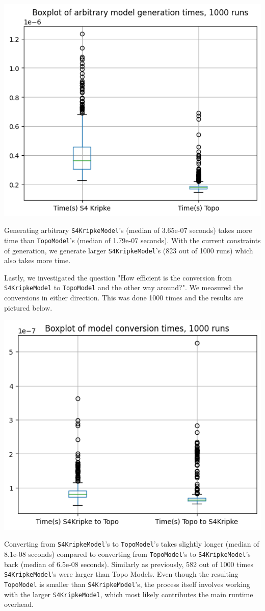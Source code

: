 \documentclass[12pt, a4paper]{article}
\begin{document}
\begin{center}
\includegraphics*[width=0.5\linewidth]{bench-model-generation.png}
\end{center}

Generating arbitrary \verb|S4KripkeModel|'s (median of 3.65e-07 seconds) takes more time than \verb|TopoModel|'s
(median of 1.79e-07 seconds). With the current constraints of generation, we generate larger
\verb|S4KripkeModel|'s (823 out of 1000 runs) which also takes more time.

Lastly, we investigated the question "How efficient is the conversion from \verb|S4KripkeModel| to \verb|TopoModel|
and the other way around?". We measured the conversions in either direction.
This was done 1000 times and the results are pictured below.

\begin{center}
\includegraphics*[width=0.5\linewidth]{bench-model-conversion.png}
\end{center}

Converting from \verb|S4KripkeModel|'s to \verb|TopoModel|'s takes slightly longer (median of 8.1e-08 seconds)
compared to converting from \verb|TopoModel|'s to \verb|S4KripkeModel|'s back (median of 6.5e-08 seconds).
Similarly as previously, 582 out of 1000 times \verb|S4KripkeModel|'s were larger than Topo Models.
Even though the resulting \verb|TopoModel| is smaller than \verb|S4KripkeModel|'s, the process itself involves
working with the larger \verb|S4KripkeModel|, which most likely contributes the main runtime overhead.
\end{document}
